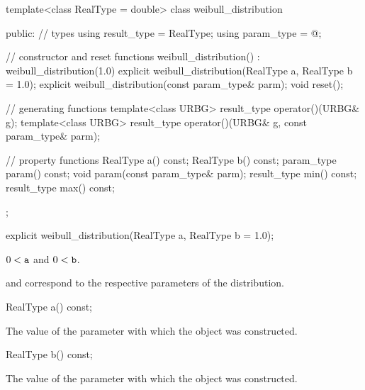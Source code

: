 %
%
\begin{codeblock}
template<class RealType = double>
  class weibull_distribution {
  public:
    // types
    using result_type = RealType;
    using param_type  = @\unspec@;

    // constructor and reset functions
    weibull_distribution() : weibull_distribution(1.0) {}
    explicit weibull_distribution(RealType a, RealType b = 1.0);
    explicit weibull_distribution(const param_type& parm);
    void reset();

    // generating functions
    template<class URBG>
      result_type operator()(URBG& g);
    template<class URBG>
      result_type operator()(URBG& g, const param_type& parm);

    // property functions
    RealType a() const;
    RealType b() const;
    param_type param() const;
    void param(const param_type& parm);
    result_type min() const;
    result_type max() const;
  };
\end{codeblock}

%
\begin{itemdecl}
explicit weibull_distribution(RealType a, RealType b = 1.0);
\end{itemdecl}%

\begin{itemdescr}
\pnum
\expects
$0 < \texttt{a}$ and $0 < \texttt{b}$.

\pnum
\remarks
{} and 
correspond to the respective parameters of the distribution.
\end{itemdescr}

%
\begin{itemdecl}
RealType a() const;
\end{itemdecl}

\begin{itemdescr}
\pnum
\returns
The value of the  parameter
 with which the object was constructed.
\end{itemdescr}

%
\begin{itemdecl}
RealType b() const;
\end{itemdecl}

\begin{itemdescr}
\pnum
\returns
The value of the  parameter
 with which the object was constructed.
\end{itemdescr}

